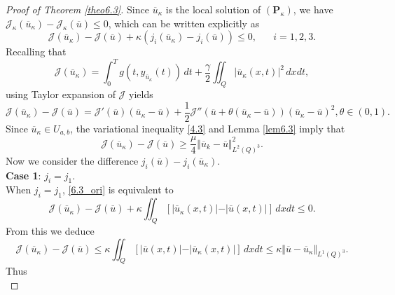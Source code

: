 \documentclass[reqno]{amsart}
\begin{document}
	\begin{proof}[Proof of Theorem \ref{theo6.3}]
		Since $\overline{u}_\kappa$ is the local solution of $(\textbf{P}_\kappa)$, we have $\mathcal{J}_\kappa(\overline{u}_\kappa)- \mathcal{J}_\kappa(\overline{u}) \leq 0$, which can be written explicitly as
		\begin{equation} \label{6.3_ori}
			\mathcal{J}(\overline{u}_\kappa) - \mathcal{J}(\overline{u}) + \kappa \left(j_i(\overline{u}_{\kappa}) - j_i(\overline{u}) \right) \leq 0, \hspace{20pt} i=1,2,3.
		\end{equation}
		Recalling that \[ \mathcal{J}({\overline{u}_\kappa}) = \int_0^T g(t, y_{\overline{u}_\kappa}(t)) \, dt+ \frac{\gamma}{2} \iint_Q \vert \overline{u}_\kappa(x,t) \vert ^2 \, dxdt, \]
		using Taylor expansion of $\mathcal{J}$ yields
		\begin{equation*}
			\mathcal{J}({\overline{u}_\kappa}) - \mathcal{J}(\overline{u}) = \mathcal{J}'(\overline{u})(\overline{u}_\kappa - \overline{u}) + \frac{1}{2} \mathcal{J}''(\overline{u}+ \theta (\overline{u}_\kappa - \overline{u}))(\overline{u}_\kappa - \overline{u})^2, \theta\in (0,1).
		\end{equation*}
		Since $\overline{u}_\kappa \in U_{a,b}$, the variational inequality \eqref{4.3} and Lemma \ref{lem6.3} imply that
		\begin{equation*}
			\mathcal{J}(\overline{u}_\kappa) - \mathcal{J}(\overline{u}) \geq \frac{\mu}{4} \Vert \overline{u}_k - \overline{u} \Vert_{L^2(Q)^3}^2 .
		\end{equation*}
		Now we consider the difference $j_i(\overline{u})-j_i(\overline{u}_{\kappa})$. \\
		\textbf{Case 1}: $j_i=j_1$.\\
		When $j_i=j_1$, \eqref{6.3_ori} is equivalent to
		\begin{equation*}
			\mathcal{J}(\overline{u}_\kappa) - \mathcal{J}(\overline{u}) + \kappa \iint_Q \left[ \vert \overline{u}_\kappa(x,t) \vert  - \vert \overline{u}(x,t) \vert \right] \, dxdt \leq 0.
		\end{equation*}
		From this we deduce
		\begin{equation*}
			\mathcal{J}(\overline{u}_\kappa) -\mathcal{J}(\overline{u}) \leq \kappa \iint_Q \left[ \vert \overline{u}(x,t) \vert - \vert\overline{u}_\kappa(x,t) \vert \right] \, dxdt \leq \kappa \Vert \overline{u} - \overline{u}_\kappa \Vert_{L^1(Q)^3}.
		\end{equation*}
		Thus
		\begin{equation} \label{6.3.2}

\end{equation}
\end{proof}
\end{document}
